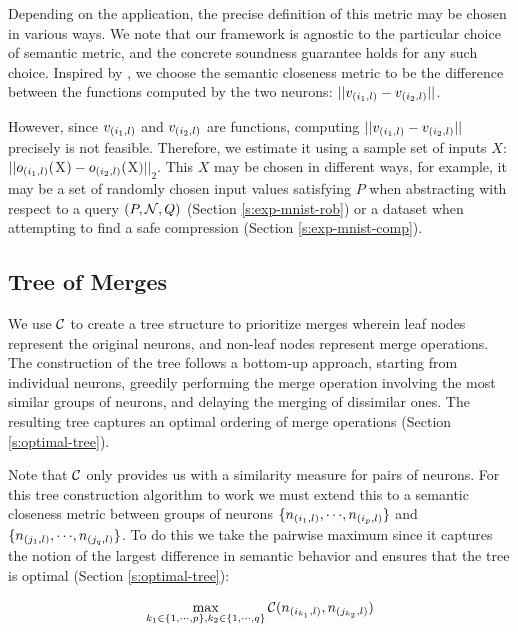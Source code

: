 Depending on the application, the precise definition of this metric may be
chosen in various ways. We note that our framework is agnostic to the particular
choice of semantic metric, and the concrete soundness guarantee holds for any such
choice. Inspired by \cite{deep-abstract}, we choose the
semantic closeness metric to be the difference between the functions computed 
by the two neurons: $||v_{(i_1,l)} - v_{(i_2,l)}||$. 

However, since $v_{(i_1,l)}$ and $v_{(i_2,l)}$ are functions, computing
$||v_{(i_1,l)} - v_{(i_2,l)}||$ precisely is not feasible.
Therefore, we estimate it using a sample set of inputs $X$: $||o_{(i_1,l)}($X$)
- o_{(i_2,l)}($X$)||_2$. This $X$ may be chosen in different ways, for example, it
may be a set of randomly chosen input values satisfying $P$ when
abstracting with respect to a query $(P, \mathcal{N}, Q)$
(Section \ref{s:exp-mnist-rob}) or a dataset when attempting to find a
safe compression (Section \ref{s:exp-mnist-comp}).

\subsection{Tree of Merges}
\label{s:tree}

We use $\mathcal{C}$ to create a tree structure to prioritize merges wherein leaf nodes
represent the original neurons, and 
non-leaf nodes represent merge operations. The construction of the tree 
follows a bottom-up approach, starting from individual neurons, 
greedily performing the merge operation involving the most similar groups of
neurons, and delaying the merging of dissimilar ones. The resulting tree
captures an optimal ordering of merge operations (Section \ref{s:optimal-tree}).

Note that $\mathcal{C}$ only provides us
with a similarity measure for pairs of neurons. For this tree construction
algorithm to work we must extend this to a semantic closeness
metric between groups of neurons
$\{n_{(i_1,l)}, {\cdots}, n_{(i_p,l)}\}$ and $\{n_{(j_1,l)}, {\cdots},
n_{(j_q,l)}\}$. To do this we take the pairwise maximum since it captures the
notion of the largest difference in semantic behavior and ensures that the tree
is optimal (Section \ref{s:optimal-tree}): 

\begin{equation*}
\begin{aligned}
    \max_{k_1 \in \{1, {\cdots}, p\},
    k_2 \in \{1, {\cdots}, q\}} \mathcal{C}( n_{(i_{k_1},l)}, n_{(j_{k_2},l)} )
\end{aligned}
\end{equation*}

